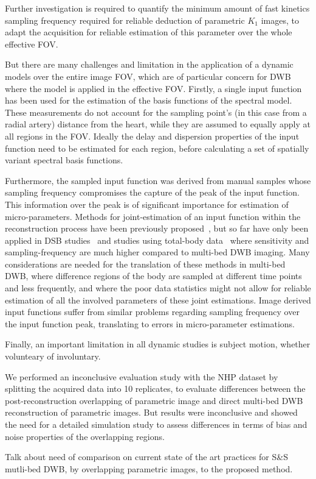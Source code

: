Further investigation is required to quantify the minimum amount of fast kinetics sampling frequency required for reliable deduction of parametric $K_1$ images, to adapt the acquisition for reliable estimation of this parameter over the whole effective FOV. 




But there are many challenges and limitation in the application of a dynamic models over the entire image FOV, which are of particular concern for DWB where the model is applied in the effective FOV. 
Firstly, a single input function has been used for the estimation of the basis functions of the spectral model. These measurements do not account for the sampling point's (in this case from a radial artery) distance from the heart, while they are assumed to equally apply at all regions in the FOV. Ideally the delay and dispersion properties of the input function need to be estimated for each region, before calculating a set of spatially variant spectral basis functions. 

Furthermore, the sampled input function was derived from manual samples whose sampling frequency compromises the capture of the peak of the input function. This information over the peak is of significant importance for estimation of micro-parameters. 
Methods for joint-estimation of an input function within the reconstruction process have been previously proposed~\cite{Wang2013,Reader2014}, but so far have only been applied in DSB studies~\cite{Reader2014} and studies using total-body data~\cite{Feng2019} where sensitivity and sampling-frequency are much higher compared to multi-bed DWB imaging.
Many considerations are needed for the translation of these methods in multi-bed DWB, where difference regions of the body are sampled at different time points and less frequently, and where the poor data statistics might not allow for reliable estimation of all the involved parameters of these joint estimations. 
Image derived input functions suffer from similar problems regarding sampling frequency over the input function peak, translating to errors in micro-parameter estimations.



Finally, an important limitation in all dynamic studies is subject motion, whether volunteary of involuntary. 


We performed an inconclusive evaluation study with the NHP dataset by splitting the acquired data into 10 replicates, to evaluate differences between the post-reconstruction overlapping of parametric image and direct multi-bed DWB reconstruction of parametric images. But results were inconclusive and showed the need for a detailed simulation study to assess differences in terms of bias and noise properties of the overlapping regions. 

Talk about need of comparison on current state of the art practices for S\&S mutli-bed DWB, by overlapping parametric images, to the proposed method.

